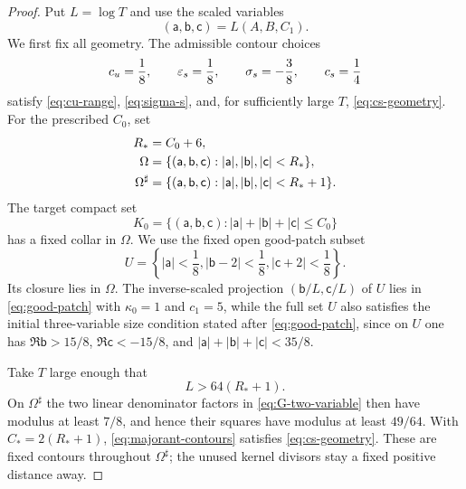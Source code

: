 \begin{proof}
Put $L=\log T$ and use the scaled variables
\begin{equation}\label{eq:scaled-shifts}
                 (\mathsf a,\mathsf b,\mathsf c)=L(A,B,C_1).
\end{equation}
We first fix all geometry.  The admissible contour choices
\begin{equation}\label{eq:majorant-contours}
 c_u=\frac18,\qquad \varepsilon_s=\frac18,\qquad
 \sigma_s=-\frac38,\qquad c_s=\frac14
\end{equation}
satisfy \eqref{eq:cu-range}, \eqref{eq:sigma-s}, and, for sufficiently
large $T$, \eqref{eq:cs-geometry}.  For the prescribed $C_0$, set
\begin{align}
 R_*&=C_0+6,\notag\\
 \Omega&=\{(\mathsf a,\mathsf b,\mathsf c):
       |\mathsf a|,|\mathsf b|,|\mathsf c|<R_*\},
 \label{eq:majorant-domain}\\
 \Omega^\sharp&=\{(\mathsf a,\mathsf b,\mathsf c):
       |\mathsf a|,|\mathsf b|,|\mathsf c|<R_*+1\}.
 \notag
\end{align}
The target compact set
\begin{equation}\label{eq:majorant-target}
 K_0=\{(\mathsf a,\mathsf b,\mathsf c):
       |\mathsf a|+|\mathsf b|+|\mathsf c|\leq C_0\}
\end{equation}
has a fixed collar in $\Omega$.  We use the fixed open good-patch subset
\begin{equation}\label{eq:majorant-good-set}
 U=\left\{ |\mathsf a|<\frac18,
       |\mathsf b-2|<\frac18,
       |\mathsf c+2|<\frac18\right\}.
\end{equation}
Its closure lies in $\Omega$.  The inverse-scaled projection
$(\mathsf b/L,\mathsf c/L)$ of $U$ lies in \eqref{eq:good-patch} with
$\kappa_0=1$ and $c_1=5$, while the
full set $U$ also satisfies the initial three-variable size condition stated
after \eqref{eq:good-patch}, since on $U$ one has
$\Re\mathsf b>15/8$, $\Re\mathsf c<-15/8$, and
$|\mathsf a|+|\mathsf b|+|\mathsf c|<35/8$.

Take $T$ large enough that
\begin{equation}\label{eq:majorant-T-threshold}
                         L>64(R_*+1).
\end{equation}
On $\Omega^\sharp$ the two linear denominator factors in
\eqref{eq:G-two-variable} then have modulus at least $7/8$, and hence their
squares have modulus at least $49/64$.  With $C_*=2(R_*+1)$,
\eqref{eq:majorant-contours} satisfies \eqref{eq:cs-geometry}.  These are
fixed contours throughout $\Omega^\sharp$; the unused kernel divisors stay
a fixed positive distance away.


\end{proof}
